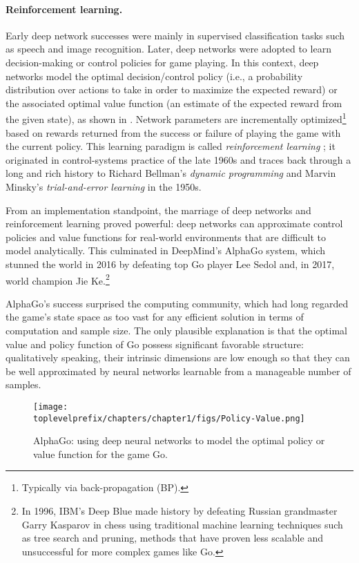 \documentclass[../../book-main.tex]{subfiles}
\begin{document}
\paragraph{Reinforcement learning.}
Early deep network successes were mainly in supervised classification tasks such as speech and image recognition. Later, deep networks were adopted to learn decision-making or control policies for game playing. In this context, deep networks model the optimal decision/control policy (i.e., a probability distribution over actions to take in order to maximize the expected reward) or the associated optimal value function (an estimate of the expected reward from the given state), as shown in . Network parameters are incrementally optimized\footnote{Typically via back-propagation (BP).} based on rewards returned from the success or failure of playing the game with the current policy. This learning paradigm is called \textit{reinforcement learning} \cite{Sutton-Barto}; it originated in control-systems practice of the late 1960s \cite{Waltz1965AHA,Mendel1970ReinforcementlearningCA} and traces back through a long and rich history to Richard Bellman's \textit{dynamic programming} \cite{Bellman-DP} and Marvin Minsky's \textit{trial-and-error learning} \cite{Minsky-1954} in the 1950s.

From an implementation standpoint, the marriage of deep networks and reinforcement learning proved powerful: deep networks can approximate control policies and value functions for real-world environments that are difficult to model analytically. This culminated in DeepMind's AlphaGo system, which stunned the world in 2016 by defeating top Go player Lee Sedol and, in 2017, world champion Jie Ke.\footnote{In 1996, IBM's Deep Blue made history by defeating Russian grandmaster Garry Kasparov in chess using traditional machine learning techniques such as tree search and pruning, methods that have proven less scalable and unsuccessful for more complex games like Go.}

AlphaGo's success surprised the computing community, which had long regarded the game's state space as too vast for any efficient solution in terms of computation and sample size. The only plausible explanation is that the optimal value and policy function of Go possess significant favorable structure: qualitatively speaking, their intrinsic dimensions are low enough so that they can be well approximated by neural networks learnable from a manageable number of samples.

\begin{figure}
    \centering
    \texttt{[image: \\toplevelprefix/chapters/chapter1/figs/Policy-Value.png]}
    \caption{AlphaGo: using deep neural networks to model the optimal policy or value function for the game Go.}
    \label{fig:Alpha-Go}
\end{figure}
\end{document}
